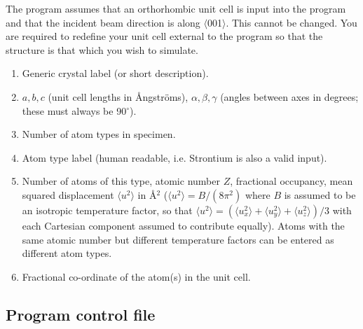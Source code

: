 \documentclass[12pt,a4paper]{article}
\begin{document}
The program assumes that an orthorhombic unit cell is input into the program and that the incident beam direction is along $\langle$001$\rangle$.
This cannot be changed.
You are required to redefine your unit cell external to the program so that the structure is that which you wish to simulate.

\begin{enumerate}
\item{Generic crystal label (or short description).}
\item{$a,b,c$ (unit cell lengths in {\AA}ngstr\"oms), $\alpha, \beta, \gamma$ (angles between axes in degrees; these must always be 90$^\circ$).}
\item{ Number of atom types in specimen.}
\item{ Atom type label (human readable,  i.e. Strontium is also a valid input).}
\item{ Number of atoms of this type, atomic number $Z$, fractional occupancy, mean squared displacement $\langle u^2 \rangle$ in {\AA}$^2$ ($\langle u^2\rangle  = B / (8 \pi^2)$ where $B$ is assumed to be an isotropic temperature factor, so that $\langle u^2 \rangle  = (\langle u_x^2\rangle+\langle u_y^2\rangle+\langle u_z^2\rangle)/3$ with each Cartesian component assumed to contribute equally). Atoms with the same atomic number but different temperature factors can be entered as different atom types.}
\item{ Fractional co-ordinate of the atom(s) in the unit cell.}

\end{enumerate}
%






\subsection{Program control file}\label{userinput}
\end{document}
